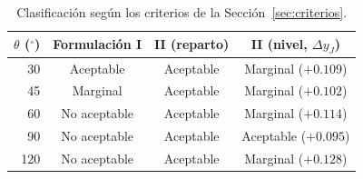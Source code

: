 \begin{table}[H]
\centering\small
\caption{Clasificación según los criterios de la Sección~\ref{sec:criterios}.}\label{tab:veredicto}
\begin{tabular}{rccc}
\toprule
$\theta$ ($^\circ$) & Formulación I & II (reparto) & II (nivel, $\Delta y_J$)\\\midrule
30 & Aceptable & Aceptable & Marginal ($+0.109$)\\
45 & Marginal & Aceptable & Marginal ($+0.102$)\\
60 & No aceptable & Aceptable & Marginal ($+0.114$)\\
90 & No aceptable & Aceptable & Aceptable ($+0.095$)\\
120 & No aceptable & Aceptable & Marginal ($+0.128$)\\\bottomrule
\end{tabular}
\end{table}
